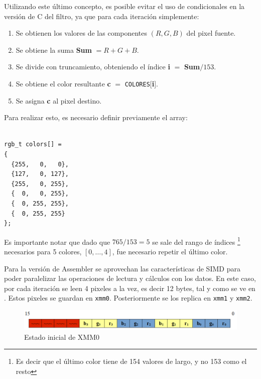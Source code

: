 Utilizando este último concepto, es posible evitar el uso de condicionales en la
versión de C del filtro, ya que para cada iteración simplemente: 

\begin{enumerate}
  \item Se obtienen los valores de las componentes $(R,G,B)$ del pixel fuente.
  \item Se obtiene la suma \textbf{Sum} $=R+G+B$.
  \item Se divide con truncamiento, obteniendo el índice \textbf{i} $=$ \textbf{Sum}$/153$.
  \item Se obtiene el color resultante \textbf{c} $=$ \texttt{COLORES}[\textbf{i}].
  \item Se asigna \textbf{c} al pixel destino.
\end{enumerate}

\newpage
Para realizar esto, es necesario definir previamente el array:
\begin{center}\begin{minipage}{10em}\begin{codesnippet}\begin{verbatim}

rgb_t colors[] =
{
  {255,   0,   0},
  {127,   0, 127},
  {255,   0, 255},
  {  0,   0, 255},
  {  0, 255, 255},
  {  0, 255, 255}
};

\end{verbatim}\end{codesnippet}\end{minipage}\end{center}  

Es importante notar que dado que $765/153=5$ se sale del rango de índices
\footnote{Es decir que el último color tiene de 154 valores de largo, y no 153
como el resto} necesarios para 5 colores, $[0,\dots,4]$, fue necesario repetir
el último color.

Para la versión de Assembler se aprovechan las características de SIMD para
poder paralelizar las operaciones de lectura y cálculos con los datos. En este
caso, por cada iteración se leen 4 pixeles a la vez, es decir 12 bytes, tal y
como se ve en . Estos pixeles se guardan en \texttt{xmm0}.
Posteriormente se los replica en \texttt{xmm1} y \texttt{xmm2}.

\begin{figure}[h]
  \begin{center}
  \includegraphics[scale=0.66]{imagenes/popart1.png}
  \caption{Estado inicial de XMM0}
  \label{fig:popart1}
  \end{center}
\end{figure}

